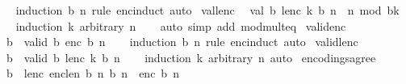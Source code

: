\begin{isabellebody}
%
\isadelimproof
\ \ %
\endisadelimproof
%
\isatagproof
{}\isamarkupfalse%
\ {\isacharparenleft}{\kern0pt}induction\ b\ n\ rule{\isacharcolon}{\kern0pt}\ enc{\isachardot}{\kern0pt}induct{\isacharparenright}{\kern0pt}\ auto%
\endisatagproof
{\isafoldproof}%
%
\isadelimproof
\isanewline
%
\endisadelimproof
\isanewline
{}\isamarkupfalse%
\ val{\isacharunderscore}{\kern0pt}lenc{\isacharcolon}{\kern0pt}\isanewline
\ \ {\isachardoublequoteopen}val\ b\ {\isacharparenleft}{\kern0pt}lenc\ k\ b\ n{\isacharparenright}{\kern0pt}\ {\isacharequal}{\kern0pt}\ n\ mod\ b{\isacharcircum}{\kern0pt}k{\isachardoublequoteclose}\isanewline
%
\isadelimproof
\ \ %
\endisadelimproof
%
\isatagproof
{}\isamarkupfalse%
\ {\isacharparenleft}{\kern0pt}induction\ k\ arbitrary{\isacharcolon}{\kern0pt}\ n{\isacharparenright}{\kern0pt}\isanewline
\ \ \isamarkupfalse%
\ {\isacharparenleft}{\kern0pt}auto\ simp\ add{\isacharcolon}{\kern0pt}\ mod{\isacharunderscore}{\kern0pt}mult{}{\isacharunderscore}{\kern0pt}eq{\isacharparenright}{\kern0pt}%
\endisatagproof
{\isafoldproof}%
%
\isadelimproof
\isanewline
%
\endisadelimproof
\isanewline
{}\isamarkupfalse%
\ valid{\isacharunderscore}{\kern0pt}enc{\isacharcolon}{\kern0pt}\isanewline
\ \ {\isachardoublequoteopen}{}{\isasymle}b\ {\isasymLongrightarrow}\ valid\ b\ {\isacharparenleft}{\kern0pt}enc\ b\ n{\isacharparenright}{\kern0pt}{\isachardoublequoteclose}\isanewline
%
\isadelimproof
\ \ %
\endisadelimproof
%
\isatagproof
{}\isamarkupfalse%
\ {\isacharparenleft}{\kern0pt}induction\ b\ n\ rule{\isacharcolon}{\kern0pt}\ enc{\isachardot}{\kern0pt}induct{\isacharparenright}{\kern0pt}\ auto%
\endisatagproof
{\isafoldproof}%
%
\isadelimproof
\isanewline
%
\endisadelimproof
\isanewline
{}\isamarkupfalse%
\ valid{\isacharunderscore}{\kern0pt}lenc{\isacharcolon}{\kern0pt}\isanewline
\ \ {\isachardoublequoteopen}{}{\isasymle}b\ {\isasymLongrightarrow}\ valid\ b\ {\isacharparenleft}{\kern0pt}lenc\ k\ b\ n{\isacharparenright}{\kern0pt}{\isachardoublequoteclose}\isanewline
%
\isadelimproof
\ \ %
\endisadelimproof
%
\isatagproof
{}\isamarkupfalse%
\ {\isacharparenleft}{\kern0pt}induction\ k\ arbitrary{\isacharcolon}{\kern0pt}\ n{\isacharparenright}{\kern0pt}\ auto%
\endisatagproof
{\isafoldproof}%
%
\isadelimproof
\isanewline
%
\endisadelimproof
\isanewline
{}\isamarkupfalse%
\ encodings{\isacharunderscore}{\kern0pt}agree{\isacharcolon}{\kern0pt}\isanewline
\ \ {\isachardoublequoteopen}{}{\isasymle}b\ {\isasymLongrightarrow}\ lenc\ {\isacharparenleft}{\kern0pt}enc{\isacharunderscore}{\kern0pt}len\ b\ n{\isacharparenright}{\kern0pt}\ b\ n\ {\isacharequal}{\kern0pt}\ enc\ b\ n{\isachardoublequoteclose}\isanewline

\end{isabellebody}
